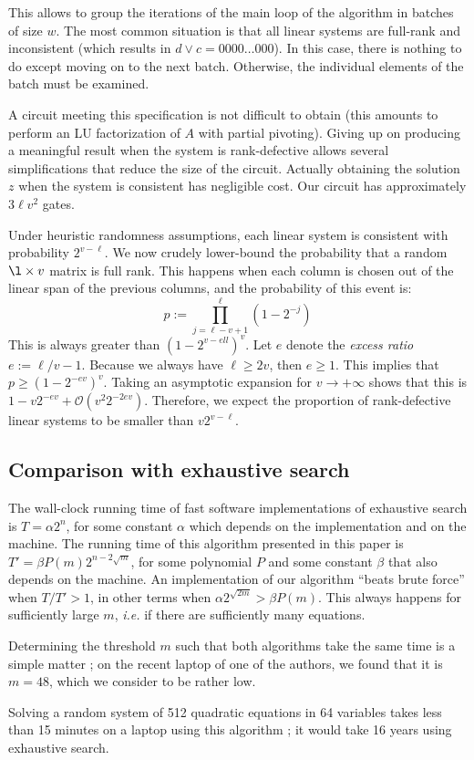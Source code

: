 \documentclass[a4paper,UKenglish,cleveref, autoref]{lipics-v2019}
\newcommand{\bigO}[1]{\ensuremath{\mathcal{O}\left( #1 \right)} }
\begin{document}
This allows to group the iterations of the main loop of the algorithm in batches
of size $w$. The most common situation is that all linear systems are full-rank
and inconsistent (which results in $d \vee c = 0000 \dots 000$). In this case,
there is nothing to do except moving on to the next batch. Otherwise, the
individual elements of the batch must be examined.  

A circuit meeting this specification is not difficult to obtain (this amounts to
perform an LU factorization of $A$ with partial pivoting). Giving up on
producing a meaningful result when the system is rank-defective allows several
simplifications that reduce the size of the circuit. Actually obtaining the
solution $z$ when the system is consistent has negligible cost. Our circuit has
approximately $3\ell v^2$ gates.

Under heuristic randomness assumptions, each linear system is consistent with
probability $2^{v-\ell}$. We now crudely lower-bound the probability that a
random $\l \times v$ matrix is full rank. This happens when each column is
chosen out of the linear span of the previous columns, and the probability of
this event is:
\[
  p := \prod_{j=\ell-v+1}^\ell \left(1 - 2^{-j} \right)
\]
This is always greater than $\left(1 - 2^{v-ell} \right)^v$. Let $e$ denote the
\emph{excess ratio} $e := \ell/v - 1$. Because we always have $\ell \geq 2v$,
then $e \geq 1$. This implies that $p \geq \left(1 - 2^{-ev} \right)^v$. Taking
an asymptotic expansion for $v \rightarrow +\infty$ shows that this is
$1 - v 2^{-ev} + \bigO{v^2 2^{-2ev}}$. Therefore, we expect the proportion of
rank-defective linear systems to be smaller than $v 2^{v-\ell}$.


\subsection{Comparison with exhaustive search}

The wall-clock running time of fast software implementations of exhaustive
search is $T = \alpha 2^n$, for some constant $\alpha$ which depends on the
implementation and on the machine. The running time of this algorithm presented
in this paper is $T' = \beta P(m) 2^{n - 2\sqrt{m}}$, for some polynomial $P$
and some constant $\beta$ that also depends on the machine. An implementation of
our algorithm ``beats brute force'' when $T/T' > 1$, in other terms when
$\alpha 2^{\sqrt{2m}} > \beta P(m)$. This always happens for sufficiently large
$m$, \textit{i.e.} if there are sufficiently many equations.

Determining the threshold $m$ such that both algorithms take the same time is a
simple matter ; on the recent laptop of one of the authors, we found that it is
$m=48$, which we consider to be rather low.

Solving a random system of 512 quadratic equations in 64 variables takes less
than 15 minutes on a laptop using this algorithm ; it would take 16 years using
exhaustive search.


\end{document}
